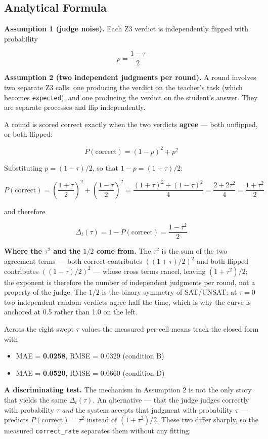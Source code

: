 \documentclass{article}
\begin{document}
\subsection{Analytical Formula}
\label{sec:analytical}

\textbf{Assumption 1 (judge noise).} Each Z3 verdict is independently flipped with probability

\[
  p = \frac{1-\tau}{2}
\]

\textbf{Assumption 2 (two independent judgments per round).} A round involves two separate Z3 calls:
one producing the verdict on the teacher's task (which becomes \texttt{expected}), and one producing
the verdict on the student's answer. They are separate processes and flip independently.

A round is scored correct exactly when the two verdicts \textbf{agree} --- both unflipped, or both
flipped:

\[
  P(\text{correct}) = (1-p)^2 + p^2
\]

Substituting $p = (1-\tau)/2$, so that $1-p = (1+\tau)/2$:

\[
  P(\text{correct}) = \left(\frac{1+\tau}{2}\right)^2 + \left(\frac{1-\tau}{2}\right)^2
  = \frac{(1+\tau)^2 + (1-\tau)^2}{4} = \frac{2 + 2\tau^2}{4} = \frac{1+\tau^2}{2}
\]

and therefore

\[
  \boxed{\;\Delta_t(\tau) = 1 - P(\text{correct}) = \frac{1-\tau^2}{2}\;}
\]

\textbf{Where the $\tau^2$ and the $1/2$ come from.} The $\tau^2$ is the sum of the two agreement
terms --- both-correct contributes $((1+\tau)/2)^2$ and both-flipped contributes $((1-\tau)/2)^2$ ---
whose cross terms cancel, leaving $(1+\tau^2)/2$; the exponent is therefore the number of independent
judgments per round, not a property of the judge. The $1/2$ is the binary symmetry of SAT/UNSAT: at
$\tau = 0$ two independent random verdicts agree half the time, which is why the curve is anchored at
0.5 rather than 1.0 on the left.

Across the eight swept $\tau$ values the measured per-cell means track the closed form with

\begin{itemize}
  \item MAE = \textbf{0.0258}, RMSE = 0.0329 (condition B)
  \item MAE = \textbf{0.0520}, RMSE = 0.0660 (condition D)
\end{itemize}

\textbf{A discriminating test.} The mechanism in Assumption 2 is not the only story that yields the
same $\Delta_t(\tau)$. An alternative --- that the judge judges correctly with probability $\tau$
\textit{and} the system accepts that judgment with probability $\tau$ --- predicts
$P(\text{correct}) = \tau^2$ instead of $(1+\tau^2)/2$. These two differ sharply, so the measured
\texttt{correct\_rate} separates them without any fitting:
\end{document}

